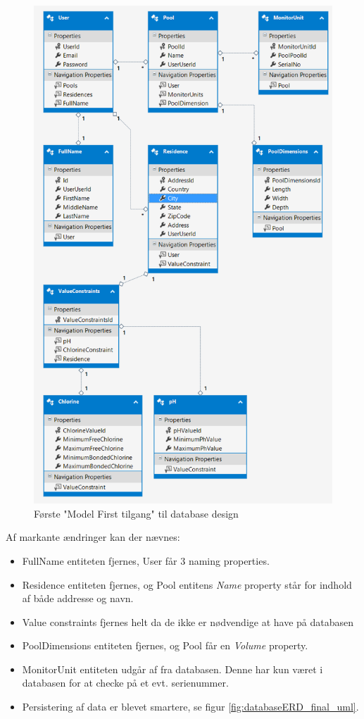 \begin{figure}[H]
	\centering
	\includegraphics[width=0.8\linewidth]{figs/design/databaseERD}
	\caption{Første "Model First tilgang" til database design}
	\label{fig:databaseERD_firstattempt_uml}
\end{figure}

Af markante ændringer kan der nævnes:

\begin{itemize}
	\item FullName entiteten fjernes, User får 3 naming properties.
	\item Residence entiteten fjernes, og Pool entitens \textit{Name} property står for indhold af både addresse og navn.
	\item Value constraints fjernes helt da de ikke er nødvendige at have på databasen
	\item PoolDimensions entiteten fjernes, og Pool får en \textit{Volume} property.
	\item MonitorUnit entiteten udgår af fra databasen. Denne har kun været i databasen for at checke på et evt. serienummer.
	\item Persistering af data er blevet smartere, se figur \ref{fig:databaseERD_final_uml}.
\end{itemize}


